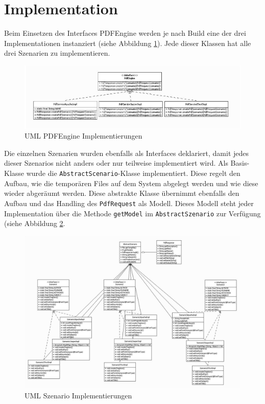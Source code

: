 \documentclass[main.tex]{subfiles}
\begin{document}
\section{Implementation}

Beim Einsetzen des Interfaces PDFEngine werden je nach Build eine der drei Implementationen instanziert (siehe Abbildung \ref{figure:pdfEngineImpl}). Jede dieser Klassen hat alle drei Szenarien zu implementieren.  


\begin{figure}[h]
 
\includegraphics[width=\textwidth ]{pic/uml/PdfEngineImplemntierung.jpg}
 \caption{UML PDFEngine Implementierungen}
 \label{figure:pdfEngineImpl}
\end{figure}

Die einzelnen Szenarien wurden ebenfalls als Interfaces deklariert, damit jedes dieser Szenarios nicht anders oder nur teilweise implementiert wird. Als Basis-Klasse wurde die \texttt{AbstractScenario}-Klasse implementiert. Diese regelt den Aufbau, wie die temporären Files auf dem System abgelegt werden und wie diese wieder abgeräumt werden. Diese abstrakte Klasse übernimmt ebenfalls den Aufbau und das Handling des \texttt{PdfRequest} als Modell. Dieses Modell steht jeder Implementation über die Methode \texttt{getModel} im \texttt{AbstractSzenario} zur Verfügung (siehe Abbildung \ref{figure:szenImpl}.   

\begin{figure}[h]
\includegraphics[width=\textwidth ]{pic/uml/SzenarioImplementation.jpg}
 \caption{UML Szenario Implementierungen}
 \label{figure:szenImpl}
\end{figure}
\end{document}
